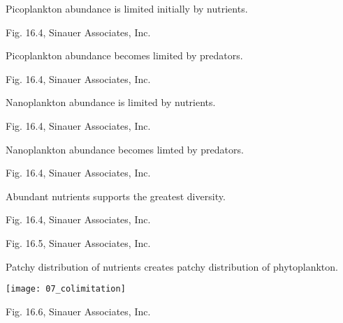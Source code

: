 \documentclass[t,handout]{beamer}  %
\begin{document}
{
\begin{frame}[b]{Picoplankton abundance is limited initially by nutrients.}

	\hfill \tiny Fig. 16.4, \textcopyright Sinauer Associates, Inc.
\end{frame}
}
%
{
\begin{frame}[b]{Picoplankton abundance becomes limited by predators.}

	\hfill \tiny Fig. 16.4, \textcopyright Sinauer Associates, Inc.
\end{frame}
}
%
{
\begin{frame}[b]{Nanoplankton abundance is limited by nutrients.}

	\hfill \tiny Fig. 16.4, \textcopyright Sinauer Associates, Inc.
\end{frame}
}
%
{
\begin{frame}[b]{Nanoplankton abundance becomes limted by predators.}

	\hfill \tiny Fig. 16.4, \textcopyright Sinauer Associates, Inc.
\end{frame}
}
%

{
\begin{frame}[b]{Abundant nutrients supports the greatest diversity.}

	\hfill \tiny Fig. 16.4, \textcopyright Sinauer Associates, Inc.
\end{frame}
}
%
{
\begin{frame}[b]



	\hfill \tiny Fig. 16.5, \textcopyright Sinauer Associates, Inc.
\end{frame}
}
%
\begin{frame}[t]{Patchy distribution of nutrients creates patchy distribution of phytoplankton.}

	\vspace*{-0.5\baselineskip}
	\begin{center}
		\texttt{[image: 07\_colimitation]}
	\end{center}
	\vfilll
	
	\hfill \tiny Fig. 16.6, \textcopyright Sinauer Associates, Inc.
\end{frame}
\end{document}
